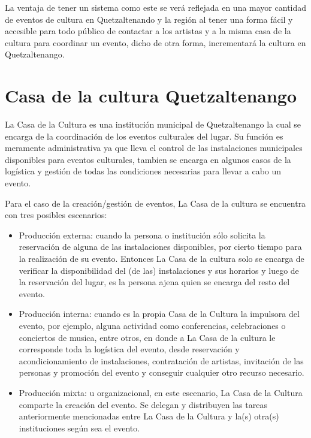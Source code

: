 \documentclass[letterpaper,11pt,spanish]{sphinxmanual}
\begin{document}
La ventaja de tener un sistema como este se verá reflejada en una mayor cantidad de eventos de cultura
en Quetzaltenando y la región al tener una forma fácil y accesible para todo público de contactar a los
artistas y a la misma casa de la cultura para coordinar un evento, dicho de otra forma, incrementará
la cultura en Quetzaltenango.


\section{Casa de la cultura Quetzaltenango}
\label{objetivos:casa-de-la-cultura-quetzaltenango}
La Casa de la Cultura es una institución municipal de Quetzaltenango la cual se
encarga de la coordinación de los eventos culturales del lugar. Su función es
meramente administrativa ya que lleva el control de las instalaciones municipales
disponibles para eventos culturales, tambien se encarga en algunos casos de la
logística y gestión de todas las condiciones necesarias para llevar a cabo un evento.

Para el caso de la creación/gestión de eventos, La Casa de la cultura se encuentra
con tres posibles escenarios:
\begin{itemize}
\item {} 
Producción externa: cuando la persona o institución sólo solicita la reservación de
alguna de las instalaciones disponibles, por cierto tiempo para la realización de su
evento. Entonces La Casa de la cultura solo se encarga de verificar la disponibilidad
del (de las) instalaciones y sus horarios y luego de la reservación del lugar, es
la persona ajena quien se encarga del resto del evento.

\item {} 
Producción interna: cuando es la propia Casa de la Cultura la impulsora del evento,
por ejemplo, alguna actividad como conferencias, celebraciones o conciertos de musica,
entre otros, en donde a La Casa de la cultura le corresponde toda la logística del
evento, desde reservación y acondicionamiento de instalaciones, contratación de artistas,
invitación de las personas y promoción del evento y conseguir cualquier otro recurso necesario.

\item {} 
Producción mixta: u organizacional, en este escenario, La Casa de la Cultura comparte
la creación del evento. Se delegan y distribuyen las tareas anteriormente mencionadas entre
La Casa de la Cultura y la(s) otra(s) instituciones según sea el evento.

\end{itemize}
\end{document}
